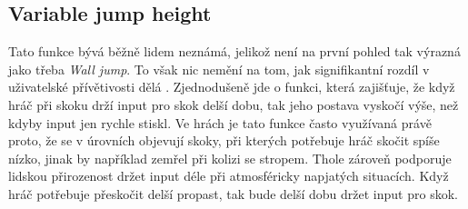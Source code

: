\subsection{Variable jump height}

Tato funkce bývá běžně lidem neznámá, jelikož není na první pohled tak výrazná jako třeba \textit{Wall jump}. To však nic nemění na tom, jak signifikantní rozdíl v uživatelské přívětivosti dělá \cite{rogp,flow-theory}. Zjednodušeně jde o funkci, která zajišťuje, že když hráč při skoku drží input pro skok delší dobu, tak jeho postava vyskočí výše, než kdyby input jen rychle stiskl. Ve hrách je tato funkce často využívaná právě proto, že se v úrovních objevují skoky, při kterých potřebuje hráč skočit spíše nízko, jinak by například zemřel při kolizi se stropem. Thole zároveň podporuje lidskou přirozenost držet input déle při atmosféricky napjatých situacích. Když hráč potřebuje přeskočit delší propast, tak bude delší dobu držet input pro skok.